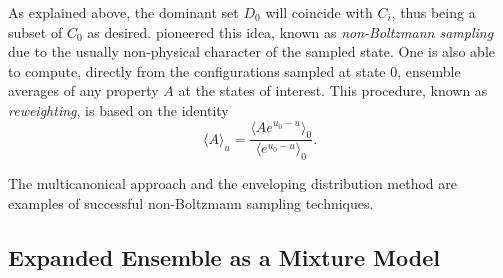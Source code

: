 \documentclass[journal=jctcce,manuscript=article,layout=twocolumn]{achemso}
\begin{document}
As explained above, the dominant set $D_0$ will coincide with $C_i$, thus being a subset of $C_0$ as desired. \citeauthor{Torrie_1977} \cite{Torrie_1977} pioneered this idea, known as \textit{non-Boltzmann sampling} due to the usually non-physical character of the sampled state. One is also able to compute, directly from the configurations sampled at state $0$, ensemble averages of any property $A$ at the states of interest. This procedure, known as \textit{reweighting}, is based on the identity \cite{Torrie_1977}
\begin{equation}
\label{eq:nbs sampling reweighting}
\langle A \rangle_u = \frac{\langle A e^{u_0 - u} \rangle_0}{\langle e^{u_0 - u} \rangle_0}.
\end{equation}

The multicanonical approach \cite{Berg_1992, Lee_1993, Abreu_2006} and the enveloping distribution method \cite{Christ_2007, Christ_2008, Christ_2009} are examples of successful non-Boltzmann sampling techniques.

\subsection{Expanded Ensemble as a Mixture Model}
\label{sec:expanded ensemble}
\end{document}
